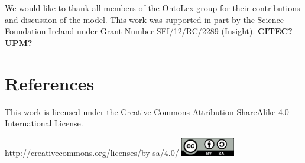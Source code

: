 \documentclass[12pt,a4paper]{elex2017}
\begin{document}
We would like to thank all members of the OntoLex group for their contributions
and discussion of the model. This work was supported in part by the Science Foundation Ireland under Grant
Number SFI/12/RC/2289 (Insight). \textbf{CITEC?} \textbf{UPM?}

\section*{References}

\printbibliography[
    type={book},
    notkeyword={dictionary},
    title={Books}
]
\printbibliography[
    type={incollection},
    title={Book Sections}
]
\printbibliography[
    type={inproceedings},
    title={Paper in conference proceedings}
]
\printbibliography[
    type={article},
    title={Journal Articles}
]
\printbibliography[
    type={misc},
    title={Technical Reports}
]
\printbibliography[
    type={book},
    keyword={dictionary},
    title={Dictionaries}
]


\medskip
\begin{minipage}[t]{\textwidth}
    \noindent This work is licensed under the Creative Commons Attribution
    ShareAlike 4.0 International License.
    \vspace{-2ex}
    \begin{center}%
        \url{http://creativecommons.org/licenses/by-sa/4.0/}\linebreak
        \includegraphics[width=2.33cm]{cc.png}%
    \end{center}
\end{minipage}
\end{document}
